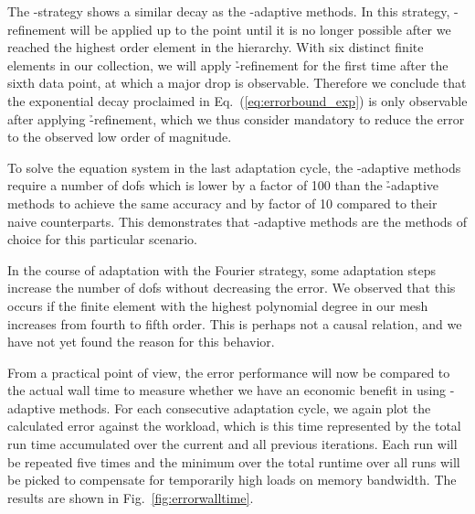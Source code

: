 The \p-strategy shows a similar decay as the \hp-adaptive methods.
In this strategy, \p-refinement will be applied up to the point until it is no longer possible after we reached the highest order element in the hierarchy. With six distinct finite elements in our collection, we will apply \h-refinement for the first time after the sixth data point, at which a major drop is observable. Therefore we conclude that the exponential decay proclaimed in Eq.~(\ref{eq:errorbound_exp}) is only observable after applying \h-refinement, which we thus consider mandatory to reduce the error to the observed low order of magnitude.

To solve the equation system in the last adaptation cycle, the \hp-adaptive methods %
require a number of \glspl{dof} which is lower by a factor of 100 than the \h-adaptive methods to achieve the same accuracy
and by factor of 10 compared to their naive counterparts. This demonstrates that \hp-adaptive methods are the methods of choice for this particular scenario.


In the course of adaptation with the Fourier strategy, some adaptation steps increase the number of \glspl{dof} without decreasing the error.
We observed that this occurs if the finite element with the highest polynomial degree in our mesh increases from fourth to fifth order. This is perhaps not a causal relation, and we have not yet found the reason for this behavior.





From a practical point of view, the error performance will now be compared to the actual wall time to measure whether we have an economic benefit in using \hp-adaptive methods. For each consecutive adaptation cycle, we again plot the calculated error against the workload, which is this time represented by the total run time accumulated over the current and all previous iterations. Each run will be repeated five times and the minimum over the total runtime over all runs will be picked to compensate for temporarily high loads on memory bandwidth. The results are shown in Fig.~\ref{fig:errorwalltime}.

